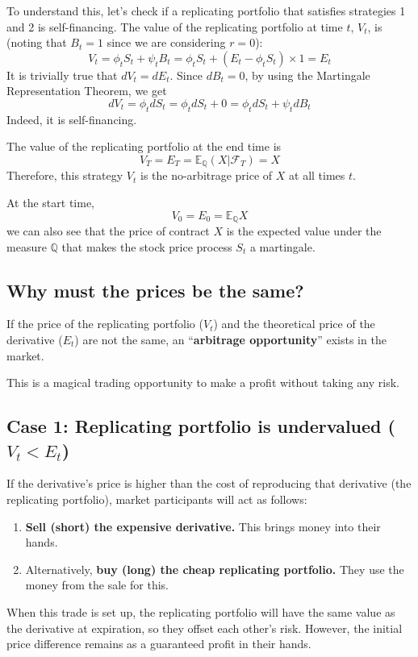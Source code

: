 \documentclass[uplatex,a4j,12pt,dvipdfmx]{jsarticle}
\begin{document}
To understand this, let's check if a replicating portfolio that satisfies strategies 1 and 2 is self-financing.
The value of the replicating portfolio at time $t$, $V_{t}$, is (noting that $B_{t} = 1$ since we are considering $r=0$):
$$V_{t} = \phi_{t} S_{t} + \psi_{t} B_{t} = \phi_{t} S_{t} + (E_{t} - \phi_{t} S_{t}) \times 1 = E_{t}$$
It is trivially true that $dV_{t} = dE_{t}$. Since $dB_{t} = 0$, by using the Martingale Representation Theorem, we get
$$dV_{t} = \phi_{t} dS_{t} = \phi_{t} dS_{t} + 0 = \phi_{t} dS_{t} + \psi_{t} dB_{t}$$
Indeed, it is self-financing.

The value of the replicating portfolio at the end time is
$$V_{T} = E_{T} = \mathbb{E}_{\mathbb{Q}}(X|\mathcal{F}_{T}) = X$$
Therefore, this strategy $V_{t}$ is the no-arbitrage price of $X$ at all times $t$.

At the start time,
$$V_{0} = E_{0} = \mathbb{E}_{\mathbb{Q}}X$$
we can also see that the price of contract $X$ is the expected value under the measure $\mathbb{Q}$ that makes the stock price process $S_{t}$ a martingale.

\subsection{Why must the prices be the same?}
If the price of the replicating portfolio ($V_t$) and the theoretical price of the derivative ($E_t$) are not the same, an “\textbf{arbitrage opportunity}” exists in the market.

This is a magical trading opportunity to make a profit without taking any risk.

\subsection{Case 1: Replicating portfolio is undervalued ($V_t < E_t$)}
If the derivative's price is higher than the cost of reproducing that derivative (the replicating portfolio), market participants will act as follows:
\begin{enumerate}
	\item \textbf{Sell (short) the expensive derivative.} This brings money into their hands.
	\item Alternatively, \textbf{buy (long) the cheap replicating portfolio.} They use the money from the sale for this.
\end{enumerate}
When this trade is set up, the replicating portfolio will have the same value as the derivative at expiration, so they offset each other's risk. However, the initial price difference remains as a guaranteed profit in their hands.
\end{document}
